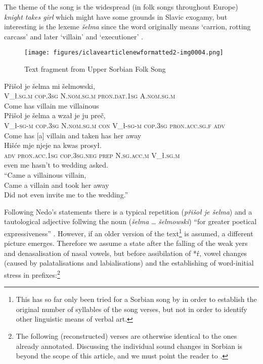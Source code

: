 \documentclass[output=paper,hidelinks]{langscibook}
\begin{document}
 
The theme of the song is the widespread (in folk songs throughout Europe) \textit{knight takes girl} which might have some grounds in Slavic exogamy, but interesting is the lexeme \textit{šelma} since the word originally means ‘carrion, rotting carcass’ and later ‘villain’ and ‘executioner’ \citep[798]{Kluge2001}.
 



\begin{figure}
\caption{Text fragment from Upper Sorbian Folk Song}
\label{fig:werner:3}
\texttt{[image: figures/iclavearticlenewformatted2-img0004.png]}
\end{figure}


\ea
\ea\glll Přišoł je šelma mi šelmowski,\\
V\_ł.\textsc{sg}.\textsc{m} \textsc{cop}.\textsc{3sg} N.\textsc{nom}.\textsc{sg}.\textsc{m} \textsc{pron}.\textsc{dat}.\textsc{1sg} A.\textsc{nom}.\textsc{sg}.\textsc{m}\\
Come has villain me villainous\\
\glt{}
\ex\glll Přišoł je šelma a wzał je ju preč,\\
V\_ł-\textsc{sg}-\textsc{m} \textsc{cop}.\textsc{3sg} N.\textsc{nom}.\textsc{sg}.\textsc{m} \textsc{con} V\_ł-\textsc{sg}-\textsc{m} \textsc{cop}.\textsc{3sg} \textsc{pron}.\textsc{acc}.\textsc{sg}.\textsc{f} \textsc{adv}\\
Come has {[a] villain} and taken has her away\\
\glt{}
\ex\glll Hišće mje njeje na kwas prosył.\\
\textsc{adv} \textsc{pron}.\textsc{acc}.\textsc{1sg} \textsc{cop}.\textsc{3sg}.\textsc{neg} \textsc{prep} N.\textsc{sg}.\textsc{acc}.\textsc{m} V\_ł.\textsc{sg}.\textsc{m}\\
    even me hasn’t to wedding asked.\\
\glt “Came a villainous villain,\\
Came a villain and took her away\\
Did not even invite me to the wedding.”\z\z

 
Following Nedo’s statements there is a typical repetition (\textit{přišoł je šelma}) and a tautological adjective follwing the noun (\textit{šelma} … \textit{šelmowski}) “for greater poetical expressiveness” \citep[198]{Nedo1966}. However, if an older version of the text\footnote{This has so far only been tried for a Sorbian song by \citet{Rawp1957} in order to establish the original number of syllables of the song verses, but not in order to identify other linguistic means of verbal art.} is assumed, a different picture emerges. Therefore we assume a state after the falling of the weak yers and denasalisation of nasal vowels, but before assibilation of *ŕ, vowel changes (caused by palatalisations and labialisations) and the establishing of word-initial stress in prefixes:\footnote{The following (reconstructed) verses are otherwise identical to the ones already annotated. Discussing the individual sound changes in Sorbian is beyond the scope of this article, and we must point the reader to \citet{Schaarschmidt1997}.}
 
\end{document}

